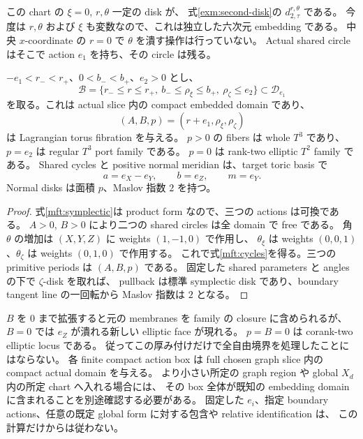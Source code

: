 この chart の $\xi=0$, $r,\theta$ 一定の disk が、
式\eqref{exm:second-disk}の $d_{2,\tau}^{r,\theta}$ である。
今度は $r,\theta$ および $\xi$ も変数なので、これは独立した六次元 embedding である。
中央 $x$-coordinate の $r=0$ で $\theta$ を潰す操作は行っていない。
Actual shared circle はそこで action $e_1$ を持ち、その circle は残る。

\begin{corollary}
\label{mft:torus-family}
$-e_1<r_-<r_+$、$0<b_-<b_+$、$e_2>0$ とし、
\[
 \mathcal B=
 \{r_-\le r\le r_+,\ b_-\le\rho_\xi\le b_+,\
                    \rho_\zeta\le e_2\}
 \subset\mathcal D_{e_1}
\]
を取る。これは actual slice 内の compact embedded domain であり、
\begin{equation}\label{mft:toric-actions}
 (A,B,p)=(r+e_1,\rho_\xi,\rho_\zeta)
\end{equation}
は Lagrangian torus fibration を与える。
$p>0$ の fibers は whole $T^3$ であり、$p=e_2$ は regular $T^3$ port family である。
$p=0$ は rank-two elliptic $T^2$ family である。
Shared cycles と positive normal meridian は、target toric basis で
\begin{equation}\label{mft:cycles}
 a=e_X-e_Y,\qquad b=e_Z,\qquad m=e_Y.
\end{equation}
Normal disks は面積 $p$、Maslov 指数 $2$ を持つ。
\end{corollary}

\begin{proof}
式\eqref{mft:symplectic}は product form なので、三つの actions は可換である。
$A>0$, $B>0$ により二つの shared circles は全 domain で free である。
角 $\theta$ の増加は $(X,Y,Z)$ に weights $(1,-1,0)$ で作用し、
$\theta_\xi$ は weights $(0,0,1)$、$\theta_\zeta$ は weights $(0,1,0)$ で作用する。
これで式\eqref{mft:cycles}を得る。三つの primitive periods は $(A,B,p)$ である。
固定した shared parameters と angles の下で $\zeta$-disk を取れば、
pullback は標準 symplectic disk であり、boundary tangent line の一回転から Maslov 指数は $2$ となる。
\end{proof}

$B$ を $0$ まで拡張すると元の membranes を family の closure に含められるが、
$B=0$ では $e_Z$ が潰れる新しい elliptic face が現れる。
$p=B=0$ は corank-two elliptic locus である。
従ってこの厚み付けだけで全自由境界を処理したことにはならない。
各 finite compact action box は full chosen graph slice 内の compact actual domain を与える。
より小さい所定の graph region や global $X_d$ 内の所定 chart へ入れる場合には、
その box 全体が既知の embedding domain に含まれることを別途確認する必要がある。
固定した $e_i$、指定 boundary actions、任意の既定 global form に対する包含や relative identification は、
この計算だけからは従わない。

